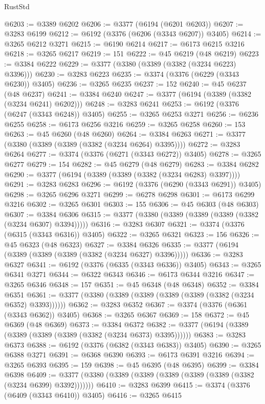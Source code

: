 \begin{lexlean}{RustStd}
\begin{coremodule}
@6203 := @3389 @6202
@6206 := @3377 (@6194 (@6201 @6203))
@6207 := @3283 @6199
@6212 := @6192 (@3376 (@6206 (@3343 @6207)) @3405)
@6214 := @3265 @6212 @3271
@6215 := @6190 @6214
@6217 := @6173 @6215 @3216
@6218 := @3265 @6217
@6219 := 151
@6222 := @45 @6219 (@48 @6219)
@6223 := @3384 @6222
@6229 := @3377 (@3380 (@3389 (@3382 (@3234 @6223) @3396)))
@6230 := @3283 @6223
@6235 := @3374 (@3376 (@6229 (@3343 @6230)) @3405)
@6236 := @3265 @6235
@6237 := 152
@6240 := @45 @6237 (@48 @6237)
@6241 := @3384 @6240
@6247 := @3377 (@6194 (@3389 (@3382 (@3234 @6241) @6202)))
@6248 := @3283 @6241
@6253 := @6192 (@3376 (@6247 (@3343 @6248)) @3405)
@6255 := @3265 @6253 @3271
@6256 := @6236 @6255
@6258 := @6173 @6256 @3216
@6259 := @3265 @6258
@6260 := 153
@6263 := @45 @6260 (@48 @6260)
@6264 := @3384 @6263
@6271 := @3377 (@3380 (@3389 (@3389 (@3382 (@3234 @6264) @3395))))
@6272 := @3283 @6264
@6277 := @3374 (@3376 (@6271 (@3343 @6272)) @3405)
@6278 := @3265 @6277
@6279 := 154
@6282 := @45 @6279 (@48 @6279)
@6283 := @3384 @6282
@6290 := @3377 (@6194 (@3389 (@3389 (@3382 (@3234 @6283) @3397))))
@6291 := @3283 @6283
@6296 := @6192 (@3376 (@6290 (@3343 @6291)) @3405)
@6298 := @3265 @6296 @3271
@6299 := @6278 @6298
@6301 := @6173 @6299 @3216
@6302 := @3265 @6301
@6303 := 155
@6306 := @45 @6303 (@48 @6303)
@6307 := @3384 @6306
@6315 := @3377 (@3380 (@3389 (@3389 (@3389 (@3382 (@3234 @6307) @3394)))))
@6316 := @3283 @6307
@6321 := @3374 (@3376 (@6315 (@3343 @6316)) @3405)
@6322 := @3265 @6321
@6323 := 156
@6326 := @45 @6323 (@48 @6323)
@6327 := @3384 @6326
@6335 := @3377 (@6194 (@3389 (@3389 (@3389 (@3382 (@3234 @6327) @3396)))))
@6336 := @3283 @6327
@6341 := @6192 (@3376 (@6335 (@3343 @6336)) @3405)
@6343 := @3265 @6341 @3271
@6344 := @6322 @6343
@6346 := @6173 @6344 @3216
@6347 := @3265 @6346
@6348 := 157
@6351 := @45 @6348 (@48 @6348)
@6352 := @3384 @6351
@6361 := @3377 (@3380 (@3389 (@3389 (@3389 (@3389 (@3382 (@3234 @6352) @3393))))))
@6362 := @3283 @6352
@6367 := @3374 (@3376 (@6361 (@3343 @6362)) @3405)
@6368 := @3265 @6367
@6369 := 158
@6372 := @45 @6369 (@48 @6369)
@6373 := @3384 @6372
@6382 := @3377 (@6194 (@3389 (@3389 (@3389 (@3389 (@3382 (@3234 @6373) @3395))))))
@6383 := @3283 @6373
@6388 := @6192 (@3376 (@6382 (@3343 @6383)) @3405)
@6390 := @3265 @6388 @3271
@6391 := @6368 @6390
@6393 := @6173 @6391 @3216
@6394 := @3265 @6393
@6395 := 159
@6398 := @45 @6395 (@48 @6395)
@6399 := @3384 @6398
@6409 := @3377 (@3380 (@3389 (@3389 (@3389 (@3389 (@3389 (@3382 (@3234 @6399) @3392)))))))
@6410 := @3283 @6399
@6415 := @3374 (@3376 (@6409 (@3343 @6410)) @3405)
@6416 := @3265 @6415

\end{coremodule}
\end{lexlean}
